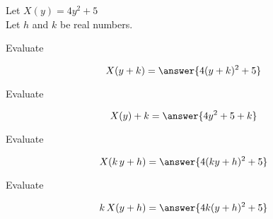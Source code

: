 \documentclass{ximera}
\author{Lee Wayand}
\begin{document}
\begin{exercise}





Let $X(y) = 4 y^2 + 5$ \\

Let $h$ and $k$ be real numbers. \\





\begin{question}


Evaluate  

\[
X(y+k) = \answer{4 (y+k)^2 + 5}
\]


\end{question}








\begin{question}


Evaluate  

\[
X(y)+k = \answer{4 y^2 + 5 + k}
\]


\end{question}









\begin{question}


Evaluate  

\[
X(k \, y + h) = \answer{4 (k y+h)^2 + 5}
\]


\end{question}













\begin{question}


Evaluate  

\[
k \, X(y + h) = \answer{4 k (y+h)^2 + 5}
\]


\end{question}













\end{exercise}
\end{document}
